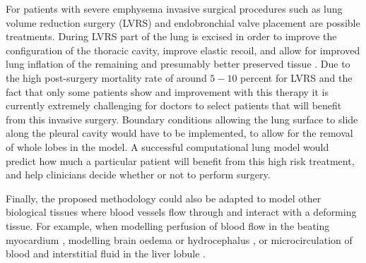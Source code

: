 For patients with severe emphysema invasive surgical procedures such as lung volume reduction surgery (LVRS) and endobronchial valve placement are possible treatments. During LVRS part of the lung is excised in order to improve the configuration of the thoracic cavity, improve elastic recoil, and allow for improved lung inflation of the remaining and presumably better preserved tissue \cite{criner2011national}. Due to the high post-surgery mortality rate of around $5-10$ percent for LVRS and the fact that only some patients show and improvement with this therapy it is currently extremely challenging for doctors to select patients that will benefit from this invasive surgery. Boundary conditions allowing the lung surface to slide along the pleural cavity would have to be implemented, to allow for the removal of whole lobes in the model. A successful computational lung model would predict how much a particular patient will benefit from this high risk treatment, and help clinicians decide whether or not to perform surgery.

Finally, the proposed methodology could also be adapted to model other biological tissues where blood vessels flow through and interact with a deforming tissue. For example, when modelling perfusion of blood flow in the beating myocardium \citep{chapelle2010poroelastic,cookson2011novel}, modelling brain oedema \citep{li2010three} or hydrocephalus \citep{wirth2006axisymmetric}, or microcirculation of blood and interstitial fluid in the liver lobule \citep{leungchavaphongse2013mathematical}.




